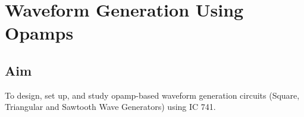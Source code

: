 
\chapter{Waveform Generation Using Opamps}

\section{Aim}
To design, set up, and study opamp-based waveform generation circuits (Square,  Triangular and Sawtooth Wave Generators) using IC 741. %

